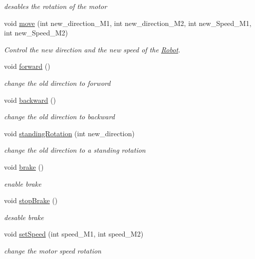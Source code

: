 \begin{DoxyCompactItemize}
\begin{DoxyCompactList}\small\item\em desables the rotation of the motor \end{DoxyCompactList}\item 
void \hyperlink{class_mobility_a678e74e5f334b25f14a17ad611b6b655}{move} (int new\+\_\+direction\+\_\+\+M1, int new\+\_\+direction\+\_\+\+M2, int new\+\_\+\+Speed\+\_\+\+M1, int new\+\_\+\+Speed\+\_\+\+M2)
\begin{DoxyCompactList}\small\item\em Control the new direction and the new speed of the \hyperlink{class_robot}{Robot}. \end{DoxyCompactList}\item 
void \hyperlink{class_mobility_afc3f555847c7beaa9bdbef2217286406}{forward} ()
\begin{DoxyCompactList}\small\item\em change the old direction to forword \end{DoxyCompactList}\item 
void \hyperlink{class_mobility_a201de04cf2f094283d20f77f2520a96f}{backward} ()
\begin{DoxyCompactList}\small\item\em change the old direction to backward \end{DoxyCompactList}\item 
void \hyperlink{class_mobility_a487708a29fef93b02a79efb466c44148}{standing\+Rotation} (int new\+\_\+direction)
\begin{DoxyCompactList}\small\item\em change the old direction to a standing rotation \end{DoxyCompactList}\item 
void \hyperlink{class_mobility_a287c595643b0ac17019ee9b875e96c72}{brake} ()
\begin{DoxyCompactList}\small\item\em enable brake \end{DoxyCompactList}\item 
void \hyperlink{class_mobility_a527a6fba662394c8e2d9ac5409b4f14a}{stop\+Brake} ()
\begin{DoxyCompactList}\small\item\em desable brake \end{DoxyCompactList}\item 
void \hyperlink{class_mobility_a781cf34ac40fc1a5a55063daa29f72a4}{set\+Speed} (int speed\+\_\+\+M1, int speed\+\_\+\+M2)
\begin{DoxyCompactList}\small\item\em change the motor speed rotation \end{DoxyCompactList}\end{DoxyCompactItemize}



